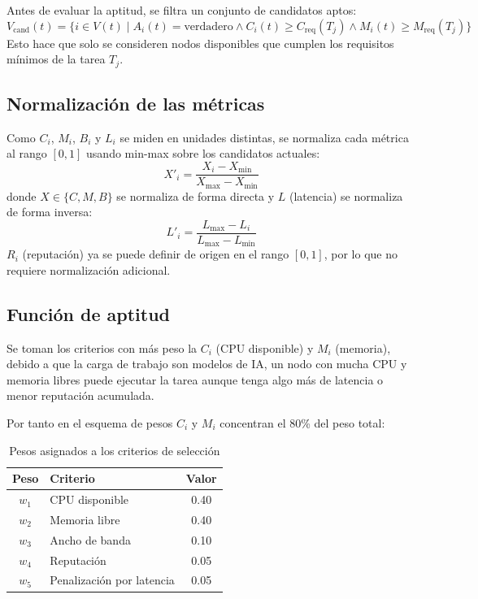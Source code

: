 \documentclass{article}
\begin{document}
Antes de evaluar la aptitud, se filtra un conjunto de candidatos aptos:
\begin{equation}
V_{\text{cand}}(t) = \{ i \in V(t) \mid A_i(t) = \text{verdadero} \land C_i(t) \ge C_{\text{req}}(T_j) \land M_i(t) \ge M_{\text{req}}(T_j) \}
\end{equation}
Esto hace que solo se consideren nodos disponibles que cumplen los requisitos mínimos de la tarea $T_j$.

\subsection{Normalización de las métricas}
Como $C_i$, $M_i$, $B_i$ y $L_i$ se miden en unidades distintas, se normaliza cada métrica al rango $[0, 1]$ usando min-max sobre los candidatos actuales:
\begin{equation}
X'_i = \frac{X_i - X_{\min}}{X_{\max} - X_{\min}}
\end{equation}
donde $X \in \{C, M, B\}$ se normaliza de forma directa y $L$ (latencia) se normaliza de forma inversa:
\begin{equation}
L'_i = \frac{L_{\max} - L_i}{L_{\max} - L_{\min}}
\end{equation}
$R_i$ (reputación) ya se puede definir de origen en el rango $[0, 1]$, por lo que no requiere normalización adicional.

\subsection{Función de aptitud}
Se toman los criterios con más peso la $C_i$ (CPU disponible) y $M_i$ (memoria), debido a que la carga de trabajo son modelos de IA, un nodo con mucha CPU y memoria libres puede ejecutar la tarea aunque tenga algo más de latencia o menor reputación acumulada.

Por tanto en el esquema de pesos $C_i$ y $M_i$ concentran el 80\% del peso total:

\begin{table}[h!]
\centering
\caption{Pesos asignados a los criterios de selección}
\begin{tabular}{c l c}
\hline
\textbf{Peso} & \textbf{Criterio} & \textbf{Valor} \\ \hline
$w_1$ & CPU disponible & 0.40 \\
$w_2$ & Memoria libre & 0.40 \\
$w_3$ & Ancho de banda & 0.10 \\
$w_4$ & Reputación & 0.05 \\
$w_5$ & Penalización por latencia & 0.05 \\ \hline
\end{tabular}
\end{table}
\end{document}
